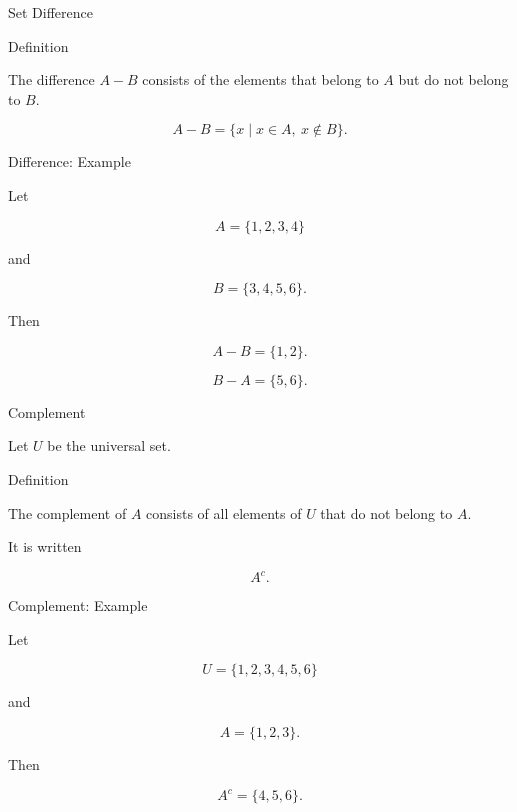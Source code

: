\documentclass[aspectratio=169,11pt]{beamer}
\begin{document}

\begin{frame}{Set Difference}

\begin{block}{Definition}

The difference $A-B$ consists of the elements that belong
to $A$ but do not belong to $B$.

\end{block}

\vspace{0.35cm}

\[
\boxed{
A-B=\{x\mid x\in A,\ x\notin B\}.
}
\]

\end{frame}


\begin{frame}{Difference: Example}

Let

\[
A=\{1,2,3,4\}
\]

and

\[
B=\{3,4,5,6\}.
\]

Then

\[
\boxed{
A-B=\{1,2\}.
}
\]

\[
\boxed{
B-A=\{5,6\}.
}
\]

\end{frame}


\begin{frame}{Complement}

Let $U$ be the universal set.

\begin{block}{Definition}

The complement of $A$ consists of all elements of $U$
that do not belong to $A$.

\end{block}

\vspace{0.35cm}

It is written

\[
\boxed{A^c}.
\]

\end{frame}


\begin{frame}{Complement: Example}

Let

\[
U=\{1,2,3,4,5,6\}
\]

and

\[
A=\{1,2,3\}.
\]

Then

\[
\boxed{
A^c=\{4,5,6\}.
}
\]

\end{frame}
\end{document}
